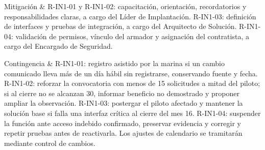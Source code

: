 \documentclass[11pt,letterpaper]{report}
\newcommand{\CampoFicha}[2]{#1 & #2 \\ \hline}
\begin{document}
{\CampoFicha{Mitigación}{%
R-IN1-01 y R-IN1-02: capacitación, orientación, recordatorios
y responsabilidades claras, a cargo del Líder de Implantación.
R-IN1-03: definición de interfaces y pruebas de integración,
a cargo del Arquitecto de Solución.
R-IN1-04: validación de permisos, vínculo del armador y
asignación del contratista, a cargo del Encargado de Seguridad.
}

\CampoFicha{Contingencia}{%
R-IN1-01: registro asistido por la marina si un cambio comunicado
lleva más de un día hábil sin registrarse, conservando fuente
y fecha.
R-IN1-02: reforzar la convocatoria con menos de 15 solicitudes
a mitad del piloto; si al cierre no se alcanzan 30, informar
beneficio no demostrado y proponer ampliar la observación.
R-IN1-03: postergar el piloto afectado y mantener la solución
base si falla una interfaz crítica al cierre del mes 16.
R-IN1-04: suspender la función ante acceso indebido confirmado,
preservar evidencia y corregir y repetir pruebas antes de
reactivarla. Los ajustes de calendario se tramitarán mediante
control de cambios.
}

}
\end{document}
